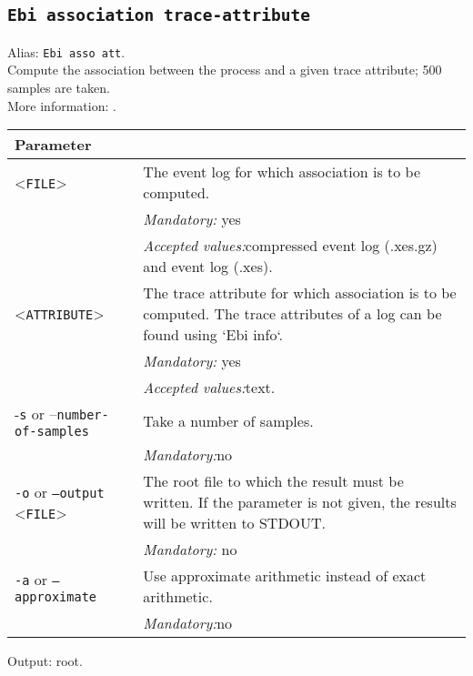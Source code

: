 {\subsection{\texttt{Ebi association trace-attribute}}
Alias: \texttt{Ebi asso att}.\\
Compute the association between the process and a given trace attribute; 500 samples are taken.\\
More information: \cite{DBLP:journals/tkde/LeemansMPH23}.\\
\begin{tabularx}{\linewidth}{lX}
\toprule
Parameter \\\midrule
<\texttt{FILE}>&The event log for which association is to be computed.\\
&\textit{Mandatory:} \quad yes\\
&\textit{Accepted values:}\quad compressed event log (.xes.gz) and event log (.xes).\\
<\texttt{ATTRIBUTE}>&The trace attribute for which association is to be computed. The trace attributes of a log can be found using `Ebi info`.\\
&\textit{Mandatory:} \quad yes\\
&\textit{Accepted values:}\quad text.\\
-\texttt{s} or --\texttt{number-of-samples}
&Take a number of samples.\\
&\textit{Mandatory:}\quad no\\
\texttt{-o} or \texttt{--output} <\texttt{FILE}> &
The root file to which the result must be written. If the parameter is not given, the results will be written to STDOUT.\\
&\textit{Mandatory:} \quad no\\
\texttt{-a} or \texttt{--approximate} & Use approximate arithmetic instead of exact arithmetic.\\
&\textit{Mandatory:}\quad no\\
\bottomrule
\end{tabularx}
Output: root.
}
